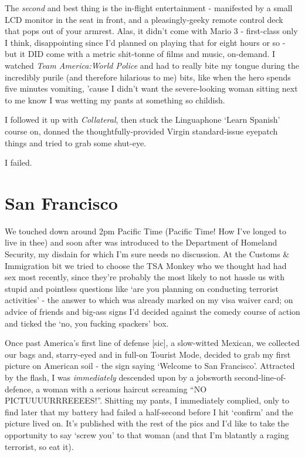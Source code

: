 \documentclass[a5paper,titlepage,draft]{book}
\begin{document}
The \emph{second} and best thing is the in-flight entertainment - manifested by a small LCD monitor in the seat in front, and a pleasingly-geeky remote control deck that pops out of your armrest.  Alas, it didn't come with Mario 3 - first-class only I think, disappointing since I'd planned on playing that for eight hours or so - but it DID come with a metric shit-tonne of films and music, on-demand.  I watched \emph{Team America:World Police} and had to really bite my tongue during the incredibly purile (and therefore hilarious to me) bits, like when the hero spends five minutes vomiting, 'cause I didn't want the severe-looking woman sitting next to me know I was wetting my pants at something so childish.

I followed it up with \emph{Collateral}, then stuck the Linguaphone `Learn Spanish' course on, donned the thoughtfully-provided Virgin standard-issue eyepatch things and tried to grab some shut-eye.

I failed.

\section*{San Francisco}
We touched down around 2pm Pacific Time (Pacific Time! How I've longed to live in thee) and soon after was introduced to the Department of Homeland Security, my disdain for which I'm sure needs no discussion.  At the Customs \& Immigration bit we tried to choose the TSA Monkey who we thought had had sex most recently, since they're probably the most likely to not hassle us with stupid and pointless questions like `are you planning on conducting terrorist activities' - the answer to which was already marked on my visa waiver card; on advice of friends and big-ass signs I'd decided against the comedy course of action and ticked the `no, you fucking spackers' box.

Once past America's first line of defense [sic], a slow-witted Mexican, we collected our bags and, starry-eyed and in full-on Tourist Mode, decided to grab my first picture on American soil - the sign saying `Welcome to San Francisco'.  Attracted by the flash, I was \emph{immediately} descended upon by a jobsworth second-line-of-defence, a woman with a serious haircut screaming ``NO PICTUUUURRREEEES!''. Shitting my pants, I immediately complied, only to find later that my battery had failed a half-second before I hit `confirm' and the picture lived on.  It's published with the rest of the pics and I'd like to take the opportunity to say `screw you' to that woman (and that I'm blatantly a raging terrorist, so eat it).
\end{document}
